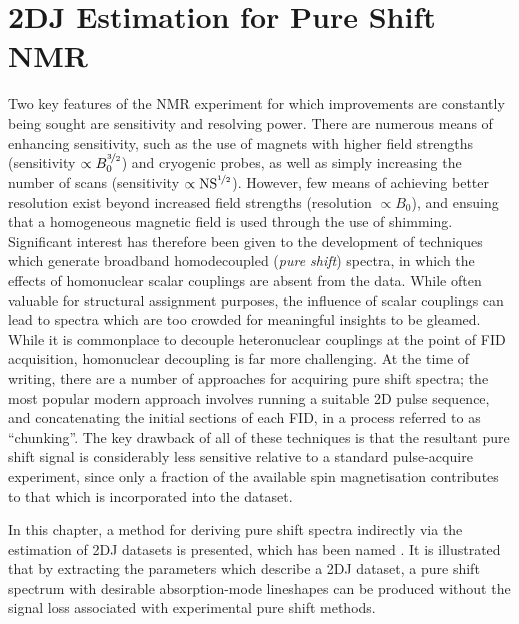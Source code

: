 \chapter{2DJ Estimation for Pure Shift NMR}
\label{chap:cupid}
Two key features of the \ac{NMR} experiment for which improvements are
constantly being sought are sensitivity and resolving power. There are numerous
means of enhancing sensitivity, such as the use of magnets with higher field
strengths\cite{Maeda2019} (sensitivity $\propto B_0^{\nicefrac{3}{2}}$) and
cryogenic probes\cite{Kovacs2020}, as well as simply
increasing the number of scans (sensitivity $\propto
\operatorname{NS}^{\nicefrac{1}{2}}$).
However, few means of achieving better resolution exist beyond increased field
strengths (resolution $\propto B_0$), and ensuing that a homogeneous magnetic
field is used through the use of shimming. Significant interest has therefore
been given to the development of techniques which generate broadband homodecoupled
(\emph{pure shift}) spectra, in which the effects of homonuclear scalar
couplings are absent from the data. While often valuable for structural
assignment purposes, the influence of scalar couplings can lead to spectra
which are too crowded for meaningful insights to be gleamed. While it is
commonplace to decouple heteronuclear couplings at the point of \ac{FID}
acquisition\cite{Shaka1983a, Shaka1983b,Shaka1985}, homonuclear decoupling is
far more challenging. At the time of writing, there are a number of approaches
for acquiring pure shift spectra; the most popular modern approach
involves running a suitable \ac{2D} pulse sequence, and concatenating the initial
sections of each \ac{FID}, in a process referred to as
``chunking''\cite{Meyer2013,Adams2014,Zangger2015}. The key drawback of all of
these techniques is that the resultant pure shift signal is considerably less
sensitive relative to a standard pulse-acquire experiment, since only a
fraction of the available spin magnetisation contributes to that which is
incorporated into the dataset.

In this chapter, a method for deriving pure shift spectra indirectly via the
estimation of \ac{2DJ} datasets is presented, which has been named
. It is illustrated that by extracting the parameters which
describe a \ac{2DJ} dataset, a pure shift spectrum with desirable
absorption-mode lineshapes can be produced without the signal loss associated
with experimental pure shift methods.





